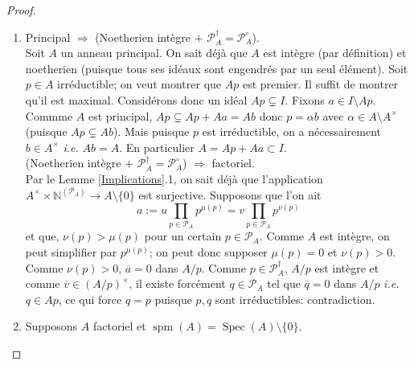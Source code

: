 \documentclass[a4paper, oneside, 12pt]{book}
\theoremstyle{theoremeStyle} %
\theoremstyle{definition} %
\newcommand{\ie}{\textit{i.e.}} %
\DeclareMathOperator{\Spec}{Spec}
\DeclareMathOperator{\spm}{spm}
\newcommand{\N}{\mathbb{N}}
\begin{document}
\begin{proof} \begin{enumerate}[leftmargin=* ,parsep=0cm,itemsep=0cm,topsep=0cm]
\item  Principal $\Rightarrow$ (Noetherien intègre $+$ $\mathcal{P}_A^\dag=\mathcal{P}_A^\circ$). \\

 Soit $A$ un anneau principal. On sait déjà que  $A$ est  intègre (par définition) et  noetherien (puisque tous ses idéaux sont engendrés par un seul élément). Soit $p\in A $ irréductible; on veut montrer que $ Ap$ est premier. Il suffit de montrer qu'il est maximal. Considérons donc un idéal $Ap\subsetneq I $. Fixons $a\in I\setminus Ap$. Commme $A$ est principal, $Ap\subsetneq Ap+Aa=Ab$ donc $p=\alpha b$ avec $\alpha\in A\setminus A^\times$ (puisque $Ap\subsetneq Ab$). Mais puisque $p$ est irréductible, on a nécessairement $b\in A^\times$ \ie{} $Ab=A$. En particulier $A=Ap+Aa \subset I$.\\

 (Noetherien intègre $+$ $\mathcal{P}_A^\dag=\mathcal{P}_A^\circ$) $\Rightarrow$ factoriel.\\

 Par le Lemme \ref{Implications}.1, on sait déjà que l'application $A^\times\times \N^{(\mathcal{P}_A)} \rightarrow A\setminus\lbrace 0\rbrace $ est surjective.
Supposons que
l'on ait $$a:=u\prod_{p\in \mathcal{P}_A}p^{\mu(p)}=v\prod_{p\in \mathcal{P}_A}p^{\nu(p)}$$
et que, $\nu(p)>\mu(p)$ pour un certain $p\in \mathcal{P}_A$. Comme $A$ est intègre, on peut simplifier par $p^{\mu(p)}$; on peut donc supposer $\mu(p)=0$ et $\nu(p)>0$. Comme $\nu(p)>0$, $\overline{a}=0$  dans $A/p$. Comme $p\in \mathcal{P}_A^\dag$,  $A/p$ est intègre et comme $\overline{v}\in (A/p)^\times$, il existe forcément $q\in \mathcal{P}_A$ tel que $\overline{q}=0 $ dans $A/p$ \ie{} $q\in Ap$, ce qui force $q=p$ puisque $p,q$ sont irréductibles: contradiction.\\

\item Supposons   $A$ factoriel et $\spm(A)= \Spec(A)\setminus \lbrace 0\rbrace$.\\


\end{enumerate}
\end{proof}
\end{document}
